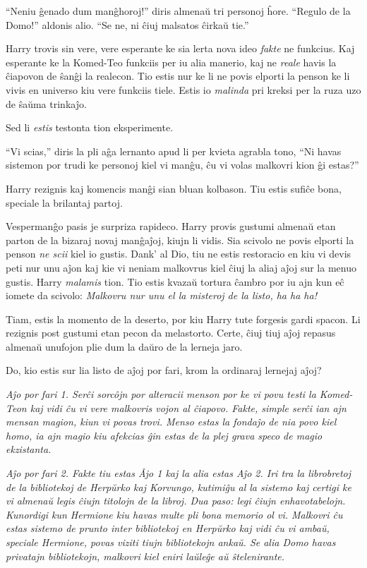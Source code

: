 ``Neniu ĝenado dum manĝhoroj!'' diris almenaŭ tri personoj
ĥore. ``Regulo de la Domo!'' aldonis alio. ``Se ne, ni ĉiuj malsatos
ĉirkaŭ tie.''

Harry trovis sin vere, vere esperante ke sia lerta nova ideo
\emph{fakte} ne funkcius. Kaj esperante ke la Komed-Teo funkciis per
iu alia manerio, kaj ne \emph{reale} havis la ĉiapovon de ŝanĝi la
realecon. Tio estis nur ke li ne povis elporti la penson ke li vivis
en universo kiu vere funkciis tiele. Estis io \emph{malinda} pri
kreksi per la ruza uzo de ŝaŭma trinkaĵo.

Sed li \emph{estis} testonta tion eksperimente.

``Vi scias,'' diris la pli aĝa lernanto apud li per kvieta agrabla
tono, ``Ni havas sistemon por trudi ke personoj kiel vi manĝu, ĉu vi
volas malkovri kion ĝi estas?''

Harry rezignis kaj komencis manĝi sian bluan kolbason. Tiu estis
sufiĉe bona, speciale la brilantaj partoj.

Vespermanĝo pasis je surpriza rapideco. Harry provis gustumi almenaŭ
etan parton de la bizaraj novaj manĝaĵoj, kiujn li vidis. Sia scivolo
ne povis elporti la penson \emph{ne scii} kiel io gustis. Dank' al
Dio, tiu ne estis restoracio en kiu vi devis peti nur unu aĵon kaj kie
vi neniam malkovrus kiel ĉiuj la aliaj aĵoj sur la menuo gustis. Harry
\emph{malamis} tion. Tio estis kvazaŭ tortura ĉambro por iu ajn kun
eĉ iomete da scivolo: \emph{Malkovru nur unu el la misteroj de la listo,
  ha ha ha!}

Tiam, estis la momento de la deserto, por kiu Harry tute forgesis
gardi spacon. Li rezignis post gustumi etan pecon da
melastorto. Certe, ĉiuj tiuj aĵoj repasus almenaŭ unufojon plie dum la
daŭro de la lerneja jaro.

Do, kio estis sur lia listo de aĵoj por fari, krom la ordinaraj
lernejaj aĵoj?

\emph{Aĵo por fari 1. Serĉi sorcôjn por alteracii menson por ke vi
  povu testi la Komed-Teon kaj vidi ĉu vi vere malkovris vojon al
  ĉiapovo. Fakte, simple serĉi ian ajn mensan magion, kiun vi povas
  trovi. Menso estas la fondaĵo de nia povo kiel homo, ia ajn magio
  kiu afekcias ĝin estas de la plej grava speco de magio ekzistanta.}

\emph{Aĵo por fari 2. Fakte tiu estas Âjo 1 kaj la alia estas Aĵo
  2. Iri tra la librobretoj de la bibliotekoj de Herpŭrko kaj
  Korvungo, kutimiĝu al la sistemo kaj certigi ke vi almenaŭ legis
  ĉiujn titolojn de la libroj. Dua paso: legi ĉiujn
  enhavotabelojn. Kunordigi kun Hermione kiu havas multe pli bona
  memorio ol vi. Malkovri ĉu estas sistemo de prunto inter bibliotekoj
  en Herpŭrko kaj vidi ĉu vi ambaŭ, speciale Hermione, povas viziti
  tiujn bibliotekojn ankaŭ. Se alia Domo havas privatajn bibliotekojn,
  malkovri kiel eniri laŭleĝe aŭ ŝtelenirante.}

